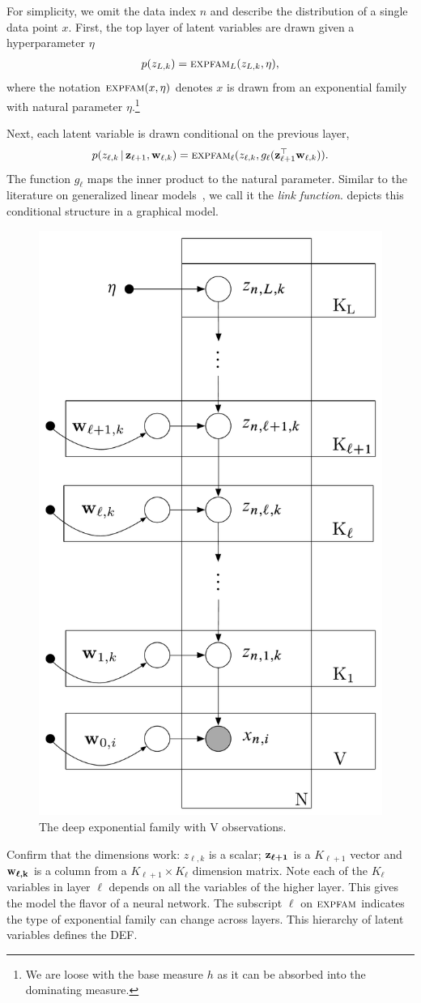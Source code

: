 \documentclass[twoside]{article}
\begin{document}
For simplicity, we omit the data index $n$ and describe the
distribution of a single data point $x$. First, the top layer of 
latent variables are drawn given a hyperparameter $\eta$
\begin{align*}
  p(z_{L,k}) =
  \textsc{expfam}_L(z_{L, k}, \eta),
\end{align*}
where the notation $\textsc{expfam}(x, \eta)$ denotes $x$ is drawn
from an exponential family with natural parameter $\eta$.\footnote{We are loose with the base measure $h$ as
it can be absorbed into the dominating measure.}

Next, each latent variable
is drawn conditional on the previous layer,
\begin{equation}
  p(z_{\ell,k} \,\vert\, \boldsymbol{\mathbf{z}}_{\ell +1},  \boldsymbol{\mathbf{w}}_{\ell,k}) =
  \textsc{expfam}_\ell(z_{\ell, k}, g_\ell(\boldsymbol{\mathbf{z}}_{\ell+1}^\top \boldsymbol{\mathbf{w}}_{\ell,k})).
  \label{eq:exp_layer}
\end{equation}
The function $g_{\ell}$ maps the inner product to the natural
parameter.  Similar to the literature on generalized linear
models~\cite{Nelder:1972}, we call it the \textit{link function}. 
 depicts this conditional structure in a graphical model.

\begin{figure}[t]
  \begin{center}
 	\centering
    \includegraphics[width=.325 \textwidth]{../fig/pdf/deep-exponential-family.pdf}
     \caption{The deep exponential family with V observations.}
     \label{fig:gm}
 \end{center}
\end{figure}
Confirm that the
dimensions work: $z_{\ell, k}$ is a scalar; $\boldsymbol{\mathbf{z_{\ell+1}}}$ 
is a $K_{\ell+1}$ vector and  $\boldsymbol{\mathbf{w_{\ell,
  k}}}$ is a column from a $K_{\ell+1} \times K_{\ell}$ dimension matrix.
Note each of the $K_{\ell}$ variables
in layer $\ell$ depends on all the variables of the higher layer.
This gives the model the flavor of a neural network. The subscript $\ell$
on $\textsc{expfam}$ indicates the type of exponential family can change across 
layers. This hierarchy of latent variables defines the DEF.  
\end{document}
